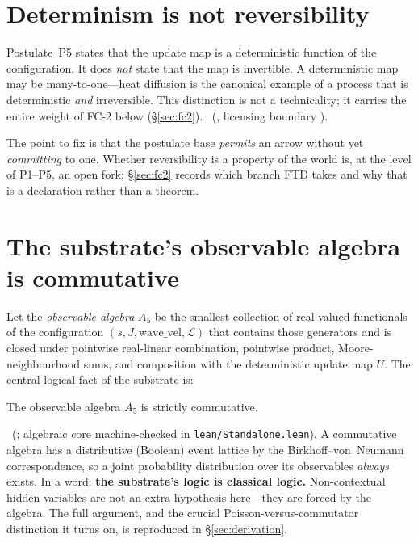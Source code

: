 \section{Determinism is not reversibility}\label{sec:det-not-rev}

Postulate~P5 states that the update map is a deterministic function of the
configuration. It does \emph{not} state that the map is invertible. A
deterministic map may be many-to-one---heat diffusion is the canonical example
of a process that is deterministic \emph{and} irreversible. This distinction is
not a technicality; it carries the entire weight of FC-2 below
(\S\ref{sec:fc2}). ~(, licensing boundary ).

The point to fix is that the postulate base \emph{permits} an arrow without yet
\emph{committing} to one. Whether reversibility is a property of the world is,
at the level of P1--P5, an open fork; \S\ref{sec:fc2} records which branch FTD
takes and why that is a declaration rather than a theorem.

\section{The substrate's observable algebra is commutative}\label{sec:commutative}

Let the \emph{observable algebra} $A_5$ be the smallest collection of
real-valued functionals of the configuration $(s, J, \mathrm{wave\_vel},
\mathcal{L})$ that contains those generators and is closed under pointwise
real-linear combination, pointwise product, Moore-neighbourhood sums, and
composition with the deterministic update map $U$. The central logical fact of
the substrate is:

\begin{result}[Commutativity of $A_5$]\label{res:commutative}
The observable algebra $A_5$ is strictly commutative.
\end{result}

\noindent
{}~(; algebraic core machine-checked in
\texttt{lean/Standalone.lean}). A commutative algebra has a distributive
(Boolean) event lattice by the Birkhoff--von~Neumann correspondence, so a joint
probability distribution over its observables \emph{always} exists. In a word:
\textbf{the substrate's logic is classical logic.} Non-contextual hidden
variables are not an extra hypothesis here---they are forced by the algebra. The
full argument, and the crucial Poisson-versus-commutator distinction it turns
on, is reproduced in \S\ref{sec:derivation}.

